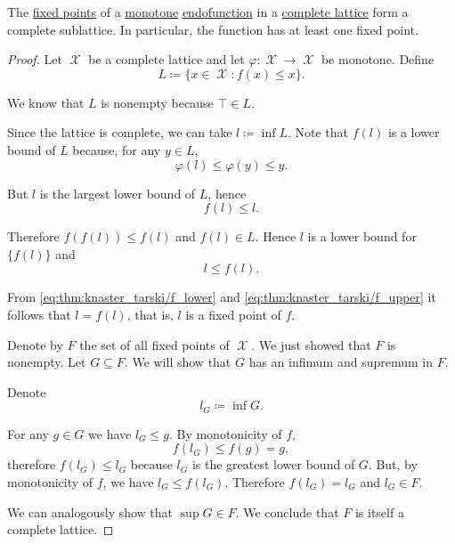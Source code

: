 \begin{proposition}\label{thm:knaster_tarski_theorem}
  The \hyperref[def:fixed_point]{fixed points} of a \hyperref[def:monotone_map]{monotone} \hyperref[def:endofunction]{endofunction} in a \hyperref[def:lattice]{complete lattice} form a complete sublattice. In particular, the function has at least one fixed point.
\end{proposition}
\begin{proof}
  Let \( \mscrX \) be a complete lattice and let \( \varphi: \mscrX \to \mscrX \) be monotone. Define
  \begin{equation*}
    L \coloneqq \{ x \in \mscrX \colon f(x) \leq x \}.
  \end{equation*}

  We know that \( L \) is nonempty because \( \top \in L \).

  Since the lattice is complete, we can take \( l \coloneqq \inf L \). Note that \( f(l) \) is a lower bound of \( L \) because, for any \( y \in L \),
  \begin{equation*}
    \varphi(l) \leq \varphi(y) \leq y.
  \end{equation*}

  But \( l \) is the largest lower bound of \( L \), hence
  \begin{equation}\label{eq:thm:knaster_tarski/f_lower}
    f(l) \leq l.
  \end{equation}

  Therefore \( f(f(l)) \leq f(l) \) and \( f(l) \in L \). Hence \( l \) is a lower bound for \( \{ f(l) \} \) and
  \begin{equation}\label{eq:thm:knaster_tarski/f_upper}
    l \leq f(l).
  \end{equation}

  From \eqref{eq:thm:knaster_tarski/f_lower} and \eqref{eq:thm:knaster_tarski/f_upper} it follows that \( l = f(l) \), that is, \( l \) is a fixed point of \( f \).

  Denote by \( F \) the set of all fixed points of \( \mscrX \). We just showed that \( F \) is nonempty. Let \( G \subseteq F \). We will show that \( G \) has an infimum and supremum in \( F \).

  Denote
  \begin{equation*}
    l_G \coloneqq \inf G.
  \end{equation*}

  For any \( g \in G \) we have \( l_G \leq g \). By monotonicity of \( f \),
  \begin{equation*}
    f(l_G) \leq f(g) = g,
  \end{equation*}
  therefore \( f(l_G) \leq l_G \) because \( l_G \) is the greatest lower bound of \( G \). But, by monotonicity of \( f \), we have \( l_G \leq f(l_G) \). Therefore \( f(l_G) = l_G \) and \( l_G \in F \).

  We can analogously show that \( \sup G \in F \). We conclude that \( F \) is itself a complete lattice.
\end{proof}

